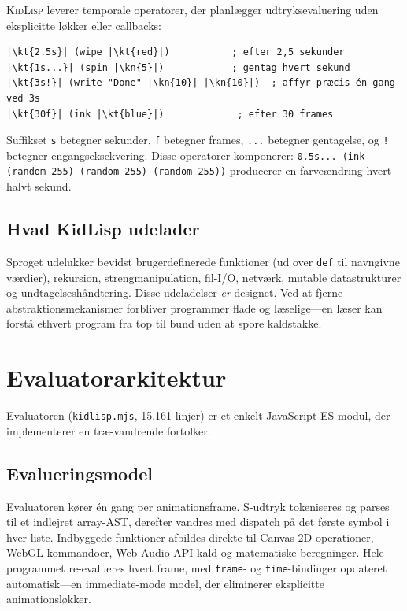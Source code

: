 \documentclass[10pt,letterpaper,twocolumn]{article}
\newcommand{\kn}[1]{\textcolor{klnum}{#1}}
\newcommand{\kt}[1]{\textcolor{klstr}{#1}}
\newcommand{\kidlisp}{\textsc{KidLisp}}
\begin{document}
\kidlisp{} leverer temporale operatorer, der planlægger udtryksevaluering uden eksplicitte løkker eller callbacks:

\begin{lstlisting}
|\kt{2.5s}| (wipe |\kt{red}|)           ; efter 2,5 sekunder
|\kt{1s...}| (spin |\kn{5}|)            ; gentag hvert sekund
|\kt{3s!}| (write "Done" |\kn{10}| |\kn{10}|)  ; affyr præcis én gang ved 3s
|\kt{30f}| (ink |\kt{blue}|)             ; efter 30 frames
\end{lstlisting}

Suffikset \texttt{s} betegner sekunder, \texttt{f} betegner frames, \texttt{...} betegner gentagelse, og \texttt{!} betegner engangseksekvering. Disse operatorer komponerer: \texttt{0.5s... (ink (random 255) (random 255) (random 255))} producerer en farveændring hvert halvt sekund.

\subsection{Hvad KidLisp udelader}

Sproget udelukker bevidst brugerdefinerede funktioner (ud over \texttt{def} til navngivne værdier), rekursion, strengmanipulation, fil-I/O, netværk, mutable datastrukturer og undtagelseshåndtering. Disse udeladelser \emph{er} designet. Ved at fjerne abstraktionsmekanismer forbliver programmer flade og læselige---en læser kan forstå ethvert program fra top til bund uden at spore kaldstakke.


\section{Evaluatorarkitektur}
\label{sec:architecture}

Evaluatoren (\texttt{kidlisp.mjs}, 15.161 linjer) er et enkelt JavaScript ES-modul, der implementerer en træ-vandrende fortolker.

\subsection{Evalueringsmodel}

Evaluatoren kører én gang per animationsframe. S-udtryk tokeniseres og parses til et indlejret array-AST, derefter vandres med dispatch på det første symbol i hver liste. Indbyggede funktioner afbildes direkte til Canvas 2D-operationer, WebGL-kommandoer, Web Audio API-kald og matematiske beregninger. Hele programmet re-evalueres hvert frame, med \texttt{frame}- og \texttt{time}-bindinger opdateret automatisk---en immediate-mode model, der eliminerer eksplicitte animationsløkker.
\end{document}
